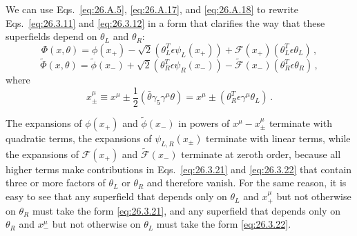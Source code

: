 We can use Eqs.~\eqref{eq:26.A.5}, \eqref{eq:26.A.17}, and
\eqref{eq:26.A.18} to rewrite Eqs.~\eqref{eq:26.3.11} and
\eqref{eq:26.3.12} in a form that clarifies the way that these superfields
depend on $\theta_L$ and $\theta_R$:
\begin{equation}
  \Phi(x,\theta)
  =\phi(x_+)-\sqrt{2}(\theta_L^T\epsilon\psi_L(x_+))
  +\mathcal{F}(x_+)(\theta_L^T\epsilon\theta_L)\,,
  \tag{26.3.21}\label{eq:26.3.21}
\end{equation}
\begin{equation}
  \widetilde{\Phi}(x,\theta)
  =\widetilde{\phi}(x_-)+\sqrt{2}(\theta_R^T\epsilon\psi_R(x_-))
  -\widetilde{\mathcal{F}}(x_-)(\theta_R^T\epsilon\theta_R)\,,
  \tag{26.3.22}\label{eq:26.3.22}
\end{equation}
where
\begin{equation}
  x_\pm^\mu\equiv x^\mu
  \pm\frac12(\bar\theta\gamma_5\gamma^\mu\theta)
  =x^\mu\pm(\theta_R^T\epsilon\gamma^\mu\theta_L)\,.
  \tag{26.3.23}\label{eq:26.3.23}
\end{equation}

The expansions of $\phi(x_+)$ and $\widetilde{\phi}(x_-)$ in powers of
$x^\mu-x_\pm^\mu$ terminate with quadratic terms, the expansions of
$\psi_{L,R}(x_\pm)$ terminate with linear terms, while the expansions of
$\mathcal{F}(x_+)$ and $\widetilde{\mathcal{F}}(x_-)$ terminate at zeroth
order, because all higher terms make contributions in
Eqs.~\eqref{eq:26.3.21} and \eqref{eq:26.3.22} that contain three or more
factors of $\theta_L$ or $\theta_R$ and therefore vanish. For the same reason,
it is easy to see that any superfield that depends only on $\theta_L$ and
$x_+^\mu$ but not otherwise on $\theta_R$ must take the form
\eqref{eq:26.3.21}, and any superfield that depends only on $\theta_R$ and
$x_-^\mu$ but not otherwise on $\theta_L$ must take the form
\eqref{eq:26.3.22}.

